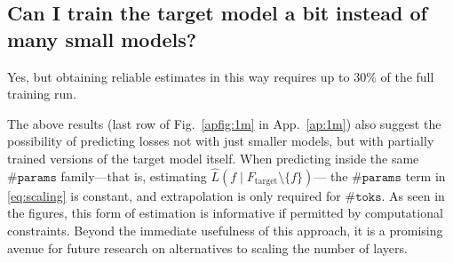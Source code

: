 \documentclass{article}
\theoremstyle{plain}
\theoremstyle{definition}
\theoremstyle{remark}
\newcommand{\mathmsize}{\#\texttt{params}}
\newcommand{\mathtokens}{\#\texttt{toks}}
\newcommand{\msize}{$\mathmsize{}$}
\newcommand{\tokens}{$\mathtokens{}$}
\newcommand{\jda}[1]{{\color{purple}[jda: #1]}}
\newcommand{\xmodel}{f}
\newcommand{\xtarget}{F_\mathrm{target}}
\newcommand{\summarybox}[1]{
  \begin{tcolorbox}[
    enhanced,
    colback=olive!8,
    colframe=olive!50,
    boxrule=0.5pt,
    left=8pt,
    right=8pt,
    top=6pt,
    bottom=6pt,
    arc=1.5mm,
    boxsep=0pt,
    fontupper=\normalfont\small\itshape,
    frame hidden,
    before skip=0pt,  %
    after skip=8pt,   %
  ]
    #1
  \end{tcolorbox}
}
\begin{document}
\subsection{Can I train the target model a bit instead of many small models?}\label{sec:1model}
\summarybox{Yes, but obtaining reliable estimates in this way requires up to 30\% of the full training run.}
The above results (last row of Fig.~\ref{apfig:1m} in App.~\ref{ap:1m}) also suggest the possibility of predicting losses not with just smaller models, but with partially trained versions of the target model itself. When predicting inside the same \msize{} family---that is, estimating $\hat{L}(\xmodel \mid \xtarget \setminus \{ \xmodel \})$---
the \msize{} term in \cref{eq:scaling} is constant, and extrapolation is only required for \tokens{}. As seen in the figures, this form of estimation is informative if permitted by computational constraints.
Beyond the immediate usefulness of this approach, it is a promising avenue for future research on alternatives to scaling the number of layers. 
\end{document}

